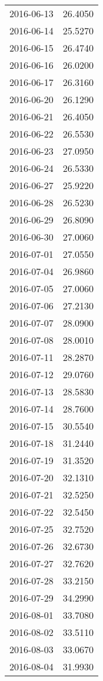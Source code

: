 \begin{tabular}{lr}
2016-06-13 &     26.4050 \\
2016-06-14 &     25.5270 \\
2016-06-15 &     26.4740 \\
2016-06-16 &     26.0200 \\
2016-06-17 &     26.3160 \\
2016-06-20 &     26.1290 \\
2016-06-21 &     26.4050 \\
2016-06-22 &     26.5530 \\
2016-06-23 &     27.0950 \\
2016-06-24 &     26.5330 \\
2016-06-27 &     25.9220 \\
2016-06-28 &     26.5230 \\
2016-06-29 &     26.8090 \\
2016-06-30 &     27.0060 \\
2016-07-01 &     27.0550 \\
2016-07-04 &     26.9860 \\
2016-07-05 &     27.0060 \\
2016-07-06 &     27.2130 \\
2016-07-07 &     28.0900 \\
2016-07-08 &     28.0010 \\
2016-07-11 &     28.2870 \\
2016-07-12 &     29.0760 \\
2016-07-13 &     28.5830 \\
2016-07-14 &     28.7600 \\
2016-07-15 &     30.5540 \\
2016-07-18 &     31.2440 \\
2016-07-19 &     31.3520 \\
2016-07-20 &     32.1310 \\
2016-07-21 &     32.5250 \\
2016-07-22 &     32.5450 \\
2016-07-25 &     32.7520 \\
2016-07-26 &     32.6730 \\
2016-07-27 &     32.7620 \\
2016-07-28 &     33.2150 \\
2016-07-29 &     34.2990 \\
2016-08-01 &     33.7080 \\
2016-08-02 &     33.5110 \\
2016-08-03 &     33.0670 \\
2016-08-04 &     31.9930 \\

\end{tabular}
